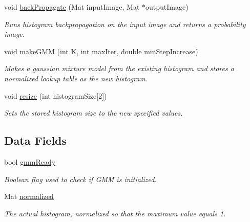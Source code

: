 \begin{DoxyCompactItemize}
void \hyperlink{classHistogram_a6f99b00a8d0e2733852092d572fca6cc}{back\-Propagate} (\-Mat input\-Image, \-Mat $\ast$output\-Image)
\begin{DoxyCompactList}\small\item\em \-Runs histogram backpropagation on the input image and returns a probability image. \end{DoxyCompactList}\item 
void \hyperlink{classHistogram_aecf785ab81dd8d694230485b42fe3488}{make\-G\-M\-M} (int \-K, int max\-Iter, double min\-Step\-Increase)
\begin{DoxyCompactList}\small\item\em \-Makes a gaussian mixture model from the existing histogram and stores a normalized lookup table as the new histogram. \end{DoxyCompactList}\item 
void \hyperlink{classHistogram_a4f24ca4c93db4bb8edf8bdb875b41158}{resize} (int histogram\-Size\mbox{[}2\mbox{]})
\begin{DoxyCompactList}\small\item\em \-Sets the stored histogram size to the new specified values. \end{DoxyCompactList}\end{DoxyCompactItemize}
\subsection*{\-Data \-Fields}
\begin{DoxyCompactItemize}
\item 
bool \hyperlink{classHistogram_a5e10a5415fa15ef0f47559eafed3e5e3}{gmm\-Ready}
\begin{DoxyCompactList}\small\item\em \-Boolean flag used to check if \-G\-M\-M is initialized. \end{DoxyCompactList}\item 
\-Mat \hyperlink{classHistogram_a09a02c61bdced17b5fe0fe2351fa8ba9}{normalized}
\begin{DoxyCompactList}\small\item\em \-The actual histogram, normalized so that the maximum value equals 1. \end{DoxyCompactList}\end{DoxyCompactItemize}
